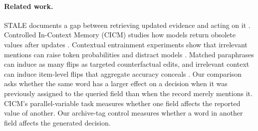 \documentclass[letterpaper]{article}
\begin{document}
\paragraph{Related work.}
STALE documents a gap between retrieving updated evidence and acting on it \citep{chao2026stale}. Controlled In-Context Memory (CICM) studies how models return obsolete values after updates \citep{guo2026context}. Contextual entrainment experiments show that irrelevant mentions can raise token probabilities and distract models \citep{niu2025entrainment}. Matched paraphrases can induce as many flips as targeted counterfactual edits, and irrelevant context can induce item-level flips that aggregate accuracy conceals \citep{yang2026compared,zhang2026illusion}. Our comparison asks whether the same word has a larger effect on a decision when it was previously assigned to the queried field than when the record merely mentions it. CICM's parallel-variable task measures whether one field affects the reported value of another. Our archive-tag control measures whether a word in another field affects the generated decision.
\end{document}
